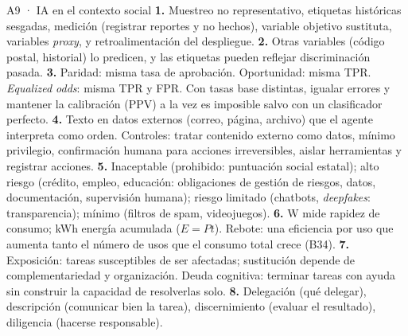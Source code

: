 \begin{solucion}{A9 · IA en el contexto social}
\textbf{1.} Muestreo no representativo, etiquetas históricas sesgadas, medición (registrar reportes y no hechos), variable objetivo sustituta,
variables \emph{proxy}, y retroalimentación del despliegue.
\textbf{2.} Otras variables (código postal, historial) lo predicen, y las etiquetas pueden reflejar discriminación pasada.
\textbf{3.} Paridad: misma tasa de aprobación. Oportunidad: misma TPR. \emph{Equalized odds}: misma TPR y FPR. Con tasas base distintas,
igualar errores y mantener la calibración (PPV) a la vez es imposible salvo con un clasificador perfecto.
\textbf{4.} Texto en datos externos (correo, página, archivo) que el agente interpreta como orden. Controles: tratar contenido externo como
datos, mínimo privilegio, confirmación humana para acciones irreversibles, aislar herramientas y registrar acciones.
\textbf{5.} Inaceptable (prohibido: puntuación social estatal); alto riesgo (crédito, empleo, educación: obligaciones de gestión de riesgos,
datos, documentación, supervisión humana); riesgo limitado (chatbots, \emph{deepfakes}: transparencia); mínimo (filtros de spam, videojuegos).
\textbf{6.} W mide rapidez de consumo; kWh energía acumulada ($E=Pt$). Rebote: una eficiencia por uso que aumenta tanto el número de usos
que el consumo total crece (B34).
\textbf{7.} Exposición: tareas susceptibles de ser afectadas; sustitución depende de complementariedad y organización. Deuda cognitiva:
terminar tareas con ayuda sin construir la capacidad de resolverlas solo.
\textbf{8.} Delegación (qué delegar), descripción (comunicar bien la tarea), discernimiento (evaluar el resultado), diligencia (hacerse responsable).
\end{solucion}
